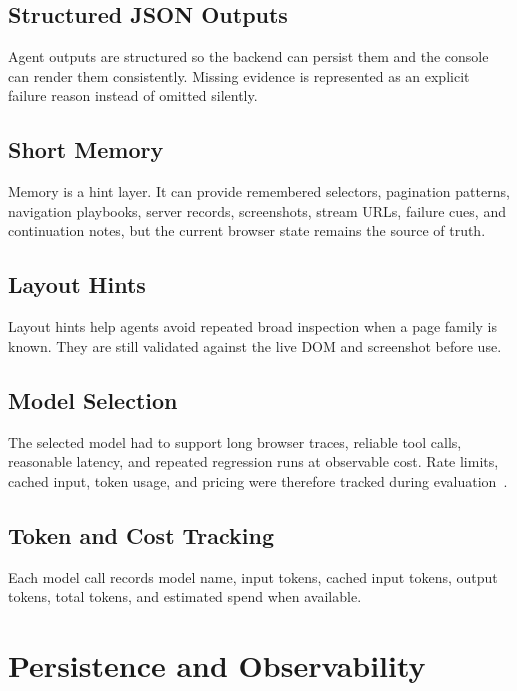 \subsection{Structured JSON Outputs}

Agent outputs are structured so the backend can persist them and the console
can render them consistently. Missing evidence is represented as an explicit
failure reason instead of omitted silently.

\subsection{Short Memory}

Memory is a hint layer. It can provide remembered selectors, pagination
patterns, navigation playbooks, server records, screenshots, stream URLs,
failure cues, and continuation notes, but the current browser state remains
the source of truth.

\subsection{Layout Hints}

Layout hints help agents avoid repeated broad inspection when a page family is
known. They are still validated against the live DOM and screenshot before use.

\subsection{Model Selection}

The selected model had to support long browser traces, reliable tool calls,
reasonable latency, and repeated regression runs at observable cost. Rate
limits, cached input, token usage, and pricing were therefore tracked during
evaluation~\cite{gemini-rate-limits,gemini-pricing,gemini-caching}.

\subsection{Token and Cost Tracking}

Each model call records model name, input tokens, cached input tokens, output
tokens, total tokens, and estimated spend when available.

\section{Persistence and Observability}

